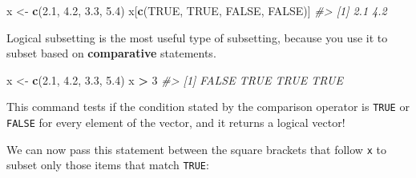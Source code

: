 \documentclass[]{book}
\newenvironment{Shaded}{\begin{snugshade}}{\end{snugshade}}
\newcommand{\KeywordTok}[1]{\textcolor[rgb]{0.13,0.29,0.53}{\textbf{#1}}}
\newcommand{\DecValTok}[1]{\textcolor[rgb]{0.00,0.00,0.81}{#1}}
\newcommand{\FloatTok}[1]{\textcolor[rgb]{0.00,0.00,0.81}{#1}}
\newcommand{\StringTok}[1]{\textcolor[rgb]{0.31,0.60,0.02}{#1}}
\newcommand{\CommentTok}[1]{\textcolor[rgb]{0.56,0.35,0.01}{\textit{#1}}}
\newcommand{\OtherTok}[1]{\textcolor[rgb]{0.56,0.35,0.01}{#1}}
\newcommand{\OperatorTok}[1]{\textcolor[rgb]{0.81,0.36,0.00}{\textbf{#1}}}
\newcommand{\NormalTok}[1]{#1}
\begin{document}
\begin{Shaded}
\begin{Highlighting}[]
\NormalTok{x <-}\StringTok{ }\KeywordTok{c}\NormalTok{(}\FloatTok{2.1}\NormalTok{, }\FloatTok{4.2}\NormalTok{, }\FloatTok{3.3}\NormalTok{, }\FloatTok{5.4}\NormalTok{)}
\NormalTok{x[}\KeywordTok{c}\NormalTok{(}\OtherTok{TRUE}\NormalTok{, }\OtherTok{TRUE}\NormalTok{, }\OtherTok{FALSE}\NormalTok{, }\OtherTok{FALSE}\NormalTok{)]}
\CommentTok{#> [1] 2.1 4.2}
\end{Highlighting}
\end{Shaded}

Logical subsetting is the most useful type of subsetting, because you
use it to subset based on \textbf{comparative} statements.

\begin{Shaded}
\begin{Highlighting}[]
\NormalTok{x <-}\StringTok{ }\KeywordTok{c}\NormalTok{(}\FloatTok{2.1}\NormalTok{, }\FloatTok{4.2}\NormalTok{, }\FloatTok{3.3}\NormalTok{, }\FloatTok{5.4}\NormalTok{)}
\NormalTok{x }\OperatorTok{>}\StringTok{ }\DecValTok{3}
\CommentTok{#> [1] FALSE  TRUE  TRUE  TRUE}
\end{Highlighting}
\end{Shaded}

This command tests if the condition stated by the comparison operator is
\texttt{TRUE} or \texttt{FALSE} for every element of the vector, and it
returns a logical vector!

We can now pass this statement between the square brackets that follow
\texttt{x} to subset only those items that match \texttt{TRUE}:

\begin{Shaded}
\end{Shaded}
\end{document}
